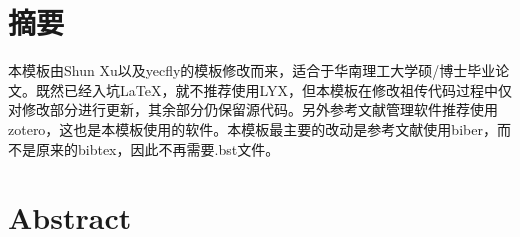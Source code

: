 \chapter{摘\texorpdfstring{\quad}{}要}
	本模板由Shun Xu\cite{_}以及yecfly\cite{_a}的模板修改而来，适合于华南理工大学硕/博士毕业论文。既然已经入坑LaTeX，就不推荐使用LYX，但本模板在修改祖传代码过程中仅对修改部分进行更新，其余部分仍保留源代码。另外参考文献管理软件推荐使用zotero，这也是本模板使用的软件。本模板最主要的改动是参考文献使用biber，而不是原来的bibtex，因此不再需要.bst文件。


\chapter{Abstract}
	

